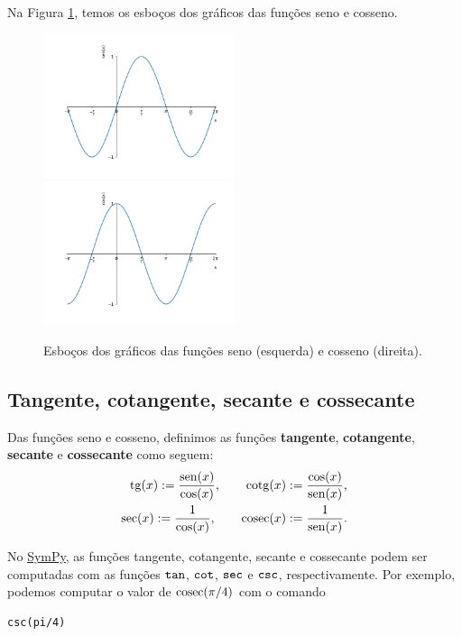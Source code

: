 Na Figura \ref{fig:cos_seno_graficos}, temos os esboços dos gráficos das funções seno e cosseno.

\begin{figure}[H]
  \centering
  \includegraphics[width=0.5\textwidth]{./cap_funcao/dados/fig_cos_seno_graficos/fig_seno_grafico}~
  \includegraphics[width=0.5\textwidth]{./cap_funcao/dados/fig_cos_seno_graficos/fig_cosseno_grafico}
  \caption{Esboços dos gráficos das funções seno (esquerda) e cosseno (direita).}
  \label{fig:cos_seno_graficos}
\end{figure}

\subsection{Tangente, cotangente, secante e cossecante}

Das funções seno e cosseno, definimos as funções {\bf tangente}, {\bf cotangente}, {\bf secante} e {\bf cossecante} como seguem:
\begin{align}
  \operatorname{tg}(x) := \frac{\operatorname{sen}(x)}{\cos(x)},\qquad \operatorname{cotg}(x) := \frac{\cos(x)}{\operatorname{sen}(x)},\\
  \sec(x) := \frac{1}{\cos(x)},\qquad \operatorname{cosec}(x) := \frac{1}{\operatorname{sen}(x)}.
\end{align}

\ifispython
No \href{https://www.sympy.org}{SymPy}, as funções tangente, cotangente, secante e cossecante podem ser computadas com as funções $\verb+tan+$, $\verb+cot+$, $\verb+sec+$ e $\verb+csc+$, respectivamente. Por exemplo, podemos computar o valor de $\operatorname{cosec}(\pi/4)$ com o comando
\begin{verbatim}
csc(pi/4)
\end{verbatim}
\fi

